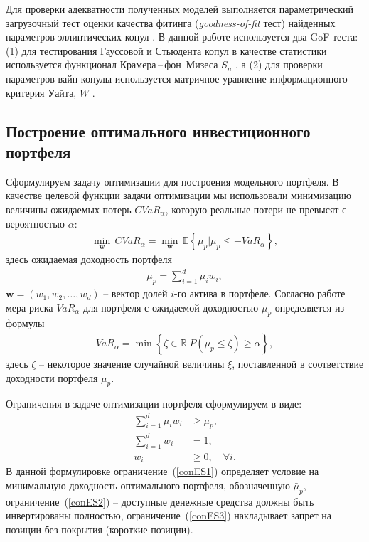 Для проверки адекватности полученных моделей выполняется параметрический загрузочный тест оценки качества фитинга (\textit{goodness-of-fit} тест) найденных параметров эллиптических копул \cite{Gen2009}.
В данной работе используется два GoF-теста: (1) для тестирования Гауссовой и Стьюдента копул в качестве статистики используется функционал Крамера\,--\,фон~Мизеса $S_n$ \cite{Gen2009}, а (2) для проверки параметров вайн копулы используется матричное уравнение информационного критерия Уайта, $W$ \cite{White1982}.


\subsection{Построение оптимального инвестиционного портфеля} 

Сформулируем задачу
оптимизации для построения модельного портфеля. В качестве целевой
функции задачи оптимизации мы использовали минимизацию величины
ожидаемых потерь $CVaR_\alpha$, которую
реальные потери не превысят с вероятностью $\alpha$: %
\begin{gather} \label{ES}
    \underset{\textbf{w}}{\min} \, CVaR_\alpha =
    \underset{\textbf{w}}{\min} \, \mathbb{E}\left\{\mu_p | \mu_p \le - VaR_\alpha
    \right\},
\end{gather}
здесь ожидаемая доходность портфеля
\begin{gather*}
\mu_p = \sum_{i=1}^d \mu_i w_i,
\end{gather*}
$\textbf{w}=(w_1, w_2, \ldots, w_d)$ -- вектор долей $i$-го актива в
портфеле. Согласно работе~\cite{Rock2000} мера риска $VaR_\alpha$ для
портфеля с ожидаемой доходностью $\mu_p$ определяется из формулы
%
\begin{gather*} \label{VaR}
    VaR_\alpha = \min\left\{\zeta \in \mathbb{R}|P(\mu_p \le \zeta) \ge \alpha \right\},
\end{gather*}
здесь $\zeta$ -- некоторое значение случайной величины $\xi$,
поставленной в соответствие доходности портфеля $\mu_p$.


Ограничения в задаче оптимизации портфеля сформулируем в виде:
\begin{subequations}\label{conES}
\begin{align}
\sum_{i=1}^d \mu_i w_i &\ge \bar{\mu}_p, \label{conES1}\\
\sum_{i=1}^d w_i &= 1, \label{conES2} \\
w_i &\ge 0, \quad \forall i. \label{conES3}
\end{align}
\end{subequations}
%
В данной формулировке ограничение~(\ref{conES1}) определяет
условие на минимальную доходность оптимального портфеля,
обозначенную $\bar{\mu}_p$, ограничение~(\ref{conES2}) --
доступные денежные средства должны быть инвертированы полностью,
ограничение~(\ref{conES3}) накладывает запрет на позиции без
покрытия (короткие позиции).

